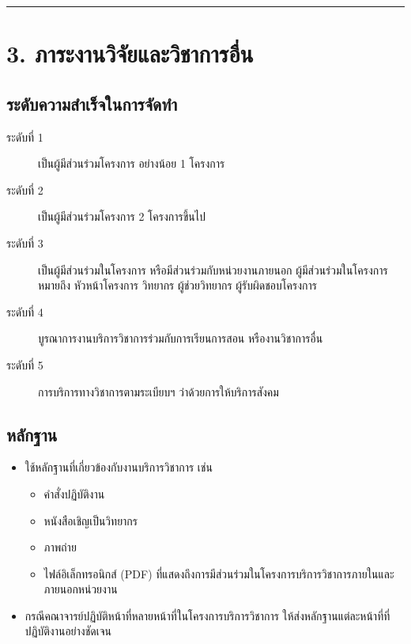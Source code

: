 \documentclass[a4paper,12pt,english]{sphinxmanual}
\begin{document}
\bigskip\hrule\bigskip



\section{3. ภาระงานวิจัยและวิชาการอื่น}
\label{\detokenize{submission_part1:id11}}

\subsection{ระดับความสำเร็จในการจัดทำ}
\label{\detokenize{submission_part1:id12}}\begin{description}
\item[{ระดับที่ 1}] \leavevmode
เป็นผู้มีส่วนร่วมโครงการ อย่างน้อย 1 โครงการ

\item[{ระดับที่ 2}] \leavevmode
เป็นผู้มีส่วนร่วมโครงการ 2 โครงการขึ้นไป

\item[{ระดับที่ 3}] \leavevmode
เป็นผู้มีส่วนร่วมในโครงการ หรือมีส่วนร่วมกับหน่วยงานภายนอก
 ผู้มีส่วนร่วมในโครงการ หมายถึง หัวหน้าโครงการ วิทยากร
ผู้ช่วยวิทยากร ผู้รับผิดชอบโครงการ

\item[{ระดับที่ 4}] \leavevmode
บูรณาการงานบริการวิชาการร่วมกับการเรียนการสอน หรืองานวิชาการอื่น

\item[{ระดับที่ 5}] \leavevmode
การบริการทางวิชาการตามระเบียบฯ ว่าด้วยการให้บริการสังคม

\end{description}


\subsection{หลักฐาน}
\label{\detokenize{submission_part1:id13}}\begin{itemize}
\item {} 
ใช้หลักฐานที่เกี่ยวข้องกับงานบริการวิชาการ เช่น
\begin{itemize}
\item {} 
คำสั่งปฏิบัติงาน

\item {} 
หนังสือเชิญเป็นวิทยากร

\item {} 
ภาพถ่าย

\item {} 
ไฟล์อิเล็กทรอนิกส์ (PDF) ที่แสดงถึงการมีส่วนร่วมในโครงการบริการวิชาการภายในและภายนอกหน่วยงาน

\end{itemize}

\item {} 
กรณีคณาจารย์ปฏิบัติหน้าที่หลายหน้าที่ในโครงการบริการวิชาการ ให้ส่งหลักฐานแต่ละหน้าที่ที่ปฏิบัติงานอย่างชัดเจน

\end{itemize}
\end{document}
